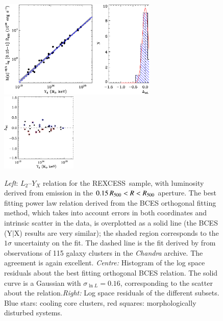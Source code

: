 \documentclass[oldversion]{aa}
\newcommand{\rexcess}{{\gwpfont REXCESS}}
\begin{document}
{%
\begin{figure}[]
\centering
\includegraphics[width=0.67\textwidth]{0944f5a.ps}
\includegraphics[width=0.32\textwidth]{0944f5b.eps}
\caption{{\footnotesize {\it Left}: $L_2$--$Y_X$ relation for the
    \rexcess\ sample, with luminosity derived from emission in the 
    $0.15\,R_{500} < R < R_{500}$ aperture. The best fitting power law relation
    derived from the BCES orthogonal fitting method, which takes into account errors in
    both coordinates and intrinsic scatter in the data, is 
    overplotted as a solid line (the BCES (Y$|$X) results are very similar); the shaded region corresponds to the $1\sigma$ uncertainty on the fit. The dashed line is the fit derived
    by \citet{maughan07} from observations of 115 galaxy clusters in
    the {\it Chandra} archive. The agreement is again excellent. {\em Centre:} 
    Histogram of the log space residuals about the best fitting orthogonal BCES relation. The solid curve is a Gaussian with $\sigma_{\ln{L}}=0.16$, corresponding to the scatter about the relation.{\em Right:} Log 
    space residuals of the different subsets. Blue stars: cooling core clusters, red squares: morphologically disturbed systems.}}\label{fig:YxLxcorr} 
   \end{figure}

}
\end{document}
